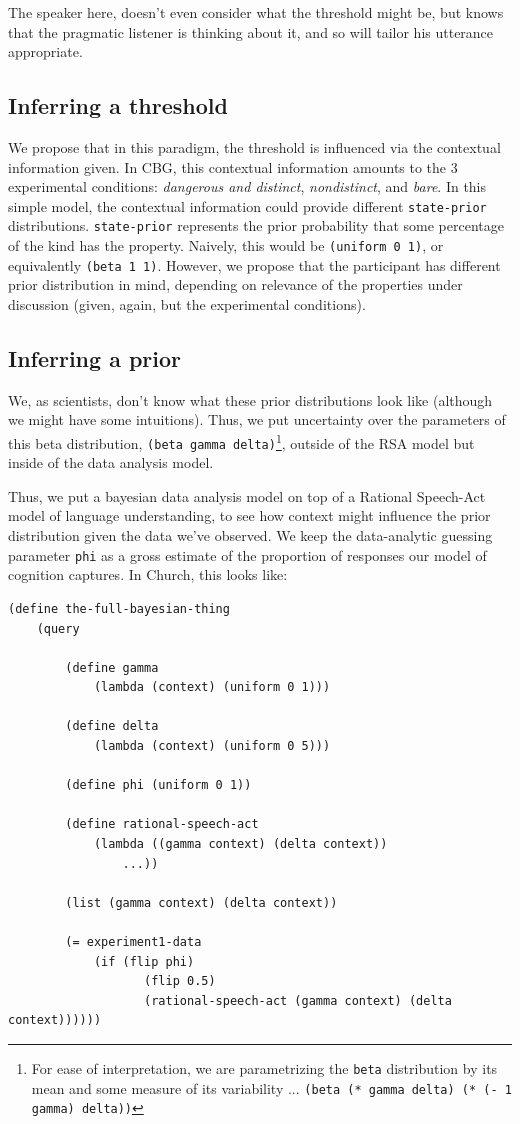 \documentclass[10pt,letterpaper]{article}
\begin{document}
The speaker here, doesn't even consider what the threshold might be, but knows that the pragmatic listener is thinking about it, and so will tailor his utterance appropriate.

\subsection{Inferring a threshold}



We propose that in this paradigm, the threshold is influenced via the contextual information given. In CBG, this contextual information amounts to the 3 experimental conditions: \emph{dangerous and distinct}, \emph{nondistinct}, and \emph{bare}. In this simple model, the contextual information could provide different \lstinline{state-prior} distributions. \lstinline{state-prior} represents the  prior probability that some percentage of the kind has the property. Naively, this would be \lstinline{(uniform 0 1)}, or equivalently \lstinline{(beta 1 1)}. However, we propose that the participant has different prior distribution in mind, depending on relevance of the properties under discussion (given, again, but the experimental conditions).

\subsection{Inferring a prior}
We, as scientists, don't know what these prior distributions look like (although we might have some intuitions). Thus, we put uncertainty over the parameters of this beta distribution, \lstinline{(beta gamma delta)}\footnote{For ease of interpretation, we are parametrizing the \lstinline{beta} distribution by its mean and some measure of its variability ... \lstinline{(beta (* gamma delta) (* (- 1 gamma) delta))}}, outside of the RSA model but inside of the data analysis model. 

Thus, we put a bayesian data analysis model on top of a Rational Speech-Act model of language understanding, to see how context might influence the prior distribution given the data we've observed. We keep the data-analytic guessing parameter \lstinline{phi} as a gross estimate of the proportion of responses our model of cognition captures. In Church, this looks like:

\begin{lstlisting}
(define the-full-bayesian-thing
	(query
	
		(define gamma
			(lambda (context) (uniform 0 1)))
			
		(define delta
			(lambda (context) (uniform 0 5)))
			
		(define phi (uniform 0 1))
	
		(define rational-speech-act
			(lambda ((gamma context) (delta context)) 
				...))
				
		(list (gamma context) (delta context))
				
		(= experiment1-data 
			(if (flip phi)
				   (flip 0.5)
				   (rational-speech-act (gamma context) (delta context))))))
\end{lstlisting}
\end{document}
